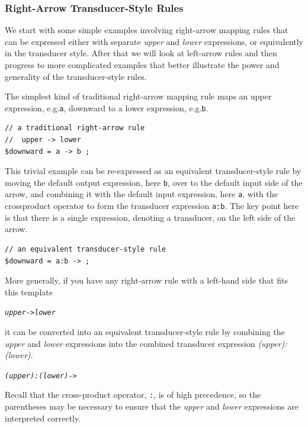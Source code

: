 \subsubsection{Right-Arrow Transducer-Style Rules}

We start with some simple examples involving right-arrow mapping rules that can be expressed either with separate
\emph{upper} and \emph{lower} expressions, or equivalently in the transducer style.  After that we
will look at left-arrow rules and then
progress to more complicated examples that better illustrate the power and generality of the
transducer-style rules.  

The simplest kind of traditional right-arrow mapping rule maps an upper expression, e.g.\@ \verb!a!, downward to a lower
expression, e.g.\@ \verb!b!.  

\begin{Verbatim}
// a traditional right-arrow rule
//  upper -> lower
$downward = a -> b ;
\end{Verbatim}

\noindent
This trivial example can be re-expressed as an equivalent transducer-style rule by moving the default
output expression, here \verb!b!, over to the default input side of the arrow, and combining it with
the default input expression, here \verb!a!, with the crossproduct operator to form the transducer expression \verb!a:b!.
The key point here is that there is a single expression, denoting a transducer, on the left side of the arrow.

\begin{Verbatim}
// an equivalent transducer-style rule
$downward = a:b -> ;
\end{Verbatim}

\noindent
More generally, if you have any right-arrow rule with a left-hand side that fits this template

\begin{alltt}
	\emph{upper} -> \emph{lower}
\end{alltt}

\noindent
it can be converted into an equivalent transducer-style rule by combining the \emph{upper} and
\emph{lower} expressions into the combined transducer expression \emph{(upper):(lower)}.

\begin{alltt}
	\emph{(upper):(lower)} ->
\end{alltt}

\noindent
Recall that the cross-product operator, \verb!:!, is of high precedence, so the parentheses may be
necessary to ensure that the \emph{upper} and \emph{lower} expressions are interpreted correctly.

